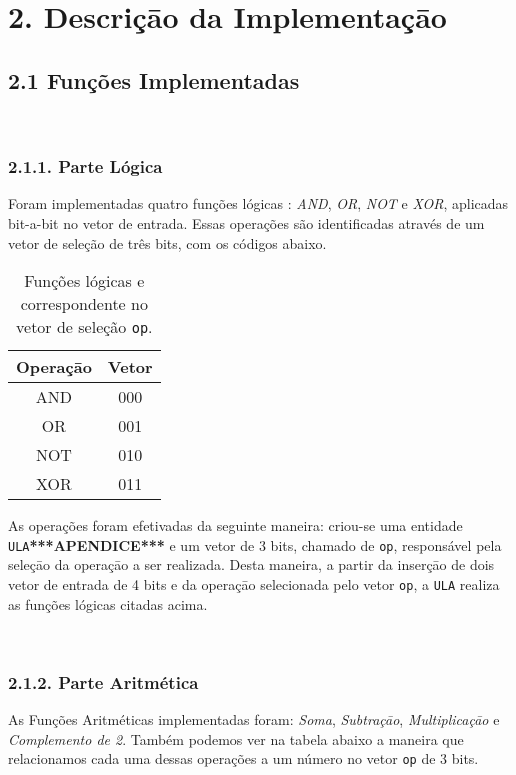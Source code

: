 \section*{2. Descriçāo da Implementaçāo}

\subsection*{2.1 Funções Implementadas}

\\\subsubsection*{2.1.1. Parte Lógica}
\newline
Foram implementadas quatro funções lógicas : \textit{AND}, \textit{OR}, \textit{NOT} e \textit{XOR}, aplicadas bit-a-bit no vetor de entrada. Essas operações são identificadas através de um vetor de seleção de três bits, com os códigos abaixo.

\begin{table}[h]
    \centering
    \begin{tabular}{|c|c|}
     \hline \textbf{Operaçāo} & \textbf{Vetor} \\
     \hline AND & 000\\
     \hline OR & 001\\
     \hline NOT & 010\\
     \hline XOR & 011\\
    \hline

\end{tabular}
    \caption{Funções lógicas e correspondente no vetor de seleção \texttt{op}.}
    \label{tab:t1}
\end{table}

As operações foram efetivadas da seguinte maneira: criou-se uma entidade \texttt{ULA}\textbf{***APENDICE***} e um vetor de 3 bits, chamado de \texttt{op},  responsável pela seleçāo da operaçāo a ser realizada. Desta maneira, a partir da inserçāo de dois vetor de entrada de 4 bits e da operaçāo selecionada pelo vetor \texttt{op}, a \texttt{ULA} realiza as funções lógicas citadas acima. 


\\\subsubsection*{2.1.2. Parte Aritmética}

As Funções Aritméticas implementadas foram: \textit{Soma}, \textit{Subtraçāo}, \textit{Multiplicaçāo} e \textit{Complemento de 2}. Também podemos ver na tabela abaixo a maneira que relacionamos cada uma dessas operações a um número no vetor \texttt{op} de 3 bits.

